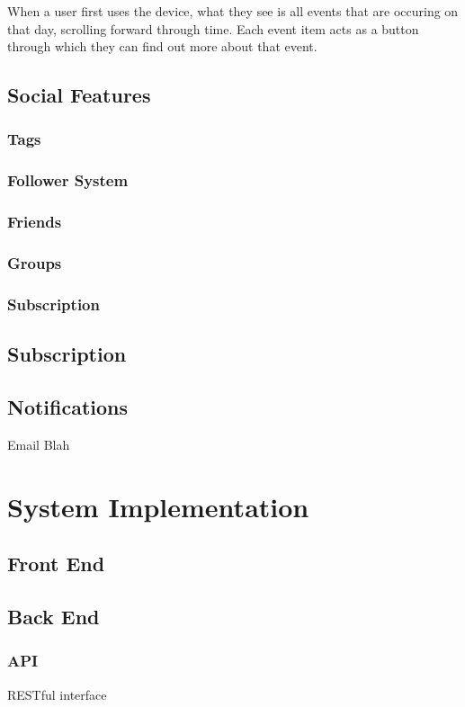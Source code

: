 \documentclass[11pt]{article}
\begin{document}
{When a user first uses the device, what they see is all events that are occuring on that day, scrolling forward through time. Each event item acts as a button through which they can find out more about that event.

\subsection {Social Features}
\subsubsection {Tags}
\subsubsection {Follower System}
\subsubsection {Friends}
\subsubsection {Groups}
\subsubsection {Subscription}
\subsection {Subscription}

\subsection {Notifications}

Email Blah

\section {System Implementation}
\subsection {Front End}
\subsection {Back End}

\subsubsection {API}
	RESTful interface
}
\end{document}
